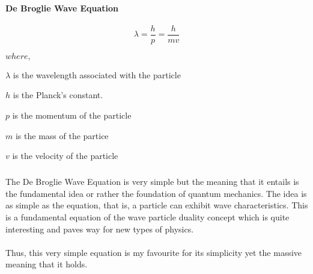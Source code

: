 \paragraph{ De Broglie Wave Equation}


       \[ \lambda=\frac{h}{p}=\frac{h}{mv} \]
        

	\hspace{1cm}	${\displaystyle where,}$ 
   
    
    \hspace{2cm}     $\lambda$ is the wavelength associated with the particle
         
        
    \hspace{2cm}      ${\displaystyle h}$  is the Planck's constant. 
        
     \hspace{2cm}     ${\displaystyle p}$  is the momentum of the particle
         
     \hspace{2cm}     ${\displaystyle m}$  is the mass of the partice
         
     \hspace{2cm}     ${\displaystyle v}$ is the velocity of the particle
        
\subparagraph{}   
The De Broglie Wave Equation is very simple but the meaning that it entails is the fundamental idea or rather the foundation of quantum mechanics. The idea is as simple as the equation, that is, a particle can exhibit wave characteristics. This is a fundamental equation of the wave particle duality concept which is quite interesting and paves way for new types of physics.
\paragraph{} 
 Thus, this very simple equation is my favourite for its simplicity yet the massive meaning that it holds. 
